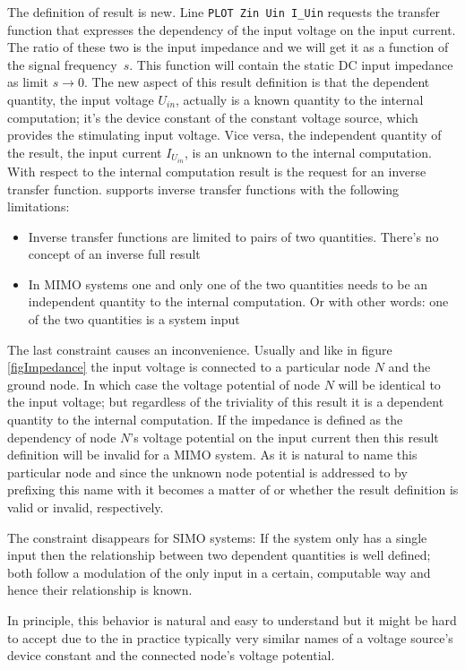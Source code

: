The definition of result  is new. Line \verb+PLOT Zin Uin I_Uin+
requests the transfer function that expresses the dependency of the input
voltage on the input current. The ratio of these two is the input
impedance and we will get it as a function of the signal frequency~$s$. This
function will contain the static DC input impedance as limit $s \to 0$. The
new aspect of this result definition is that the dependent quantity, the
input voltage $U_{in}$, actually is a known quantity to the internal
computation; it's the device constant of the constant voltage source,
which provides the stimulating input voltage. Vice versa, the independent
quantity of the result, the input current $I_{U_{in}}$, is an unknown to the
internal computation. With respect to the internal computation result
 is the request for an inverse transfer function. \linnet{}
supports inverse transfer functions with the following limitations:
\begin{itemize}
  \item Inverse transfer functions are limited to pairs of two quantities.
    There's no concept of an inverse full result
  \item In MIMO systems one and only one of the two quantities needs to be
    an independent quantity to the internal computation. Or with other
    words: one of the two quantities is a system input
\end{itemize}
The last constraint causes an inconvenience. Usually and like in figure
\ref{figImpedance} the input voltage is connected to a particular node $N$
and the ground node. In which case the voltage potential of node $N$ will
be identical to the input voltage; but regardless of the triviality of
this result it is a dependent quantity to the internal computation. If the
impedance is defined as the dependency of node $N$'s voltage potential on
the input current then this result definition will be invalid for a MIMO
system. As it is natural to name this particular node  and since
the unknown node potential is addressed to by prefixing this name with
 it becomes a matter of  or  whether the
result definition is valid or invalid, respectively.

The constraint disappears for SIMO systems: If the system only has a
single input then the relationship between two dependent quantities is well
defined; both follow a modulation of the only input in a certain,
computable way and hence their relationship is known.

In principle, this behavior is natural and easy to understand but it might
be hard to accept due to the in practice typically very similar names of a
voltage source's device constant and the connected node's voltage
potential.

